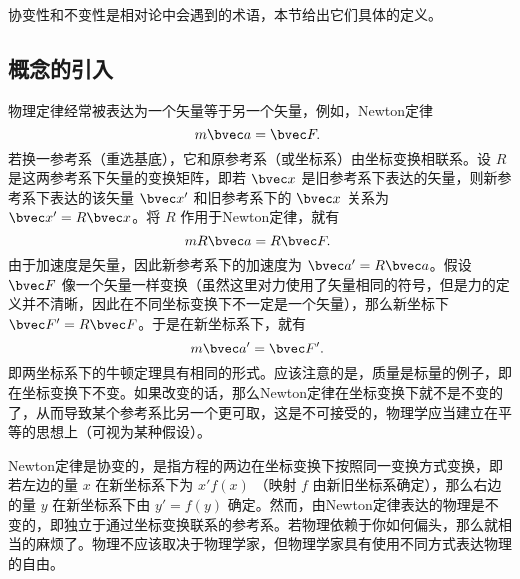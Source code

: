 
\begin{issues}
\issueMissDepend
\end{issues}

\cite{AZee}协变性和不变性是相对论中会遇到的术语，本节给出它们具体的定义。
\subsection{概念的引入}
物理定律经常被表达为一个矢量等于另一个矢量，例如，Newton定律 
\begin{equation}
m\bvec a=\bvec F.~
\end{equation}
若换一参考系（重选基底），它和原参考系（或坐标系）由坐标变换相联系。设 $R$ 是这两参考系下矢量的变换矩阵，即若 $\bvec x$ 是旧参考系下表达的矢量，则新参考系下表达的该矢量 $\bvec x'$ 和旧参考系下的 $\bvec x$ 关系为 $\bvec x'=R\bvec x$。将 $R$ 作用于Newton定律，就有
\begin{equation}
mR\bvec a=R\bvec F.~
\end{equation}
由于加速度是矢量，因此新参考系下的加速度为 $\bvec a'=R\bvec a$。假设 $\bvec F$ 像一个矢量一样变换（虽然这里对力使用了矢量相同的符号，但是力的定义并不清晰，因此在不同坐标变换下不一定是一个矢量），那么新坐标下 $\bvec F'=R\bvec F$。于是在新坐标系下，就有
\begin{equation}
m\bvec a'=\bvec F'.~
\end{equation}
即两坐标系下的牛顿定理具有相同的形式。应该注意的是，质量是标量的例子，即在坐标变换下不变。如果改变的话，那么Newton定律在坐标变换下就不是不变的了，从而导致某个参考系比另一个更可取，这是不可接受的，物理学应当建立在平等的思想上（可视为某种假设）。

Newton定律是协变的，是指方程的两边在坐标变换下按照同一变换方式变换，即若左边的量 $x$ 在新坐标系下为 $x'f(x)$ （映射 $f$ 由新旧坐标系确定），那么右边的量 $y$ 在新坐标系下由 $y'=f(y)$ 确定。然而，由Newton定律表达的物理是不变的，即独立于通过坐标变换联系的参考系。若物理依赖于你如何偏头，那么就相当的麻烦了。物理不应该取决于物理学家，但物理学家具有使用不同方式表达物理的自由。


